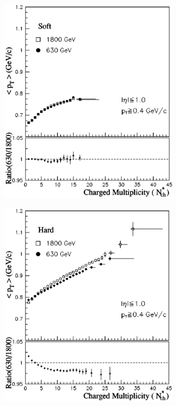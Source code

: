 \begin{figure}
  \centering
  \begin{subfigure}[b]{0.45\textwidth}
    \includegraphics[width=\textwidth]{figures/soft_mult_pt.png}
  \end{subfigure}
  \begin{subfigure}[b]{0.45\textwidth}
  \includegraphics[width=\textwidth]{figures/hard_mult_pt.png}

\end{subfigure}
\end{figure}
